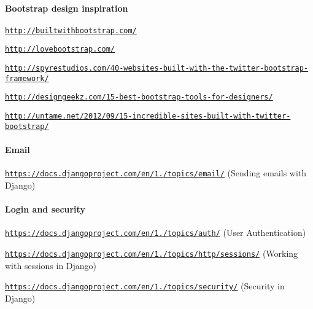 \paragraph*{Bootstrap design inspiration}


\begin{DoxyEnumerate}
\item \href{http://builtwithbootstrap.com/}{\tt http\-://builtwithbootstrap.\-com/}
\item \href{http://lovebootstrap.com/}{\tt http\-://lovebootstrap.\-com/}
\item \href{http://spyrestudios.com/40-websites-built-with-the-twitter-bootstrap-framework/}{\tt http\-://spyrestudios.\-com/40-\/websites-\/built-\/with-\/the-\/twitter-\/bootstrap-\/framework/}
\item \href{http://designgeekz.com/15-best-bootstrap-tools-for-designers/}{\tt http\-://designgeekz.\-com/15-\/best-\/bootstrap-\/tools-\/for-\/designers/}
\item \href{http://untame.net/2012/09/15-incredible-sites-built-with-twitter-bootstrap/}{\tt http\-://untame.\-net/2012/09/15-\/incredible-\/sites-\/built-\/with-\/twitter-\/bootstrap/}
\end{DoxyEnumerate}

\paragraph*{Email}


\begin{DoxyEnumerate}
\item \href{https://docs.djangoproject.com/en/1.6/topics/email/}{\tt https\-://docs.\-djangoproject.\-com/en/1./topics/email/} (Sending emails with Django)
\end{DoxyEnumerate}

\paragraph*{Login and security}


\begin{DoxyEnumerate}
\item \href{https://docs.djangoproject.com/en/1.6/topics/auth/}{\tt https\-://docs.\-djangoproject.\-com/en/1./topics/auth/} (User Authentication)
\item \href{https://docs.djangoproject.com/en/1.6/topics/http/sessions/}{\tt https\-://docs.\-djangoproject.\-com/en/1./topics/http/sessions/} (Working with sessions in Django)
\item \href{https://docs.djangoproject.com/en/1.6/topics/security/}{\tt https\-://docs.\-djangoproject.\-com/en/1./topics/security/} (Security in Django)
\end{DoxyEnumerate}

